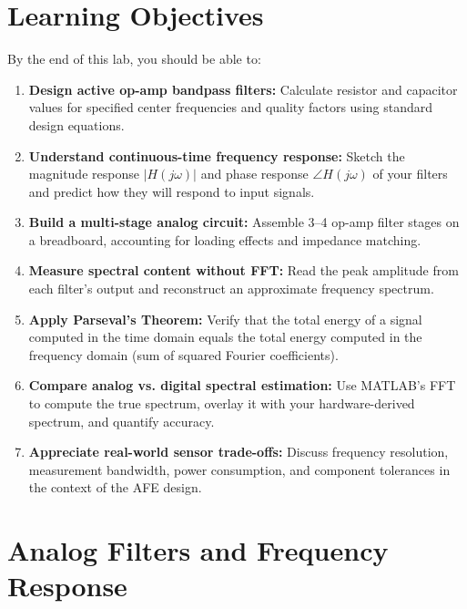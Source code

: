 \documentclass[11pt,letterpaper]{article}
\begin{document}
\section{Learning Objectives}

By the end of this lab, you should be able to:

\begin{enumerate}
    \item \textbf{Design active op-amp bandpass filters:} Calculate resistor and capacitor values for specified center frequencies and quality factors using standard design equations.

    \item \textbf{Understand continuous-time frequency response:} Sketch the magnitude response $|H(j\omega)|$ and phase response $\angle H(j\omega)$ of your filters and predict how they will respond to input signals.

    \item \textbf{Build a multi-stage analog circuit:} Assemble 3--4 op-amp filter stages on a breadboard, accounting for loading effects and impedance matching.

    \item \textbf{Measure spectral content without FFT:} Read the peak amplitude from each filter's output and reconstruct an approximate frequency spectrum.

    \item \textbf{Apply Parseval's Theorem:} Verify that the total energy of a signal computed in the time domain equals the total energy computed in the frequency domain (sum of squared Fourier coefficients).

    \item \textbf{Compare analog vs. digital spectral estimation:} Use MATLAB's FFT to compute the true spectrum, overlay it with your hardware-derived spectrum, and quantify accuracy.

    \item \textbf{Appreciate real-world sensor trade-offs:} Discuss frequency resolution, measurement bandwidth, power consumption, and component tolerances in the context of the AFE design.
\end{enumerate}

\clearpage

\section{Analog Filters and Frequency Response}
\end{document}
